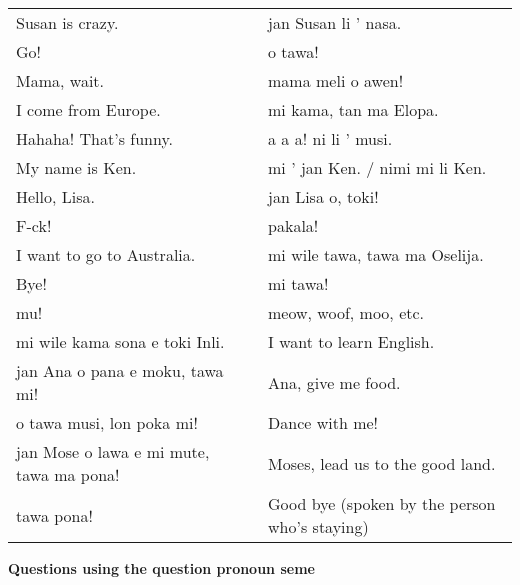 \begin{supertabular}{p{5,5cm}|ll}
Susan is crazy.  && jan Susan li ' nasa. \\ %
Go!  && o tawa! \\ %
Mama, wait.  && mama meli o awen! \\ %
I come from Europe. && mi kama, tan ma Elopa. \\ %
Hahaha! That's funny.  && a a a! ni li ' musi. \\ %
My name is Ken.  && mi ' jan Ken. / nimi mi li Ken. \\ %
Hello, Lisa.  && jan Lisa o, toki! \\ %
F-ck! && pakala! \\ %
I want to go to Australia. && mi wile tawa, tawa ma Oselija. \\  %
Bye!  && mi tawa!  \\ %
mu!  && meow, woof, moo, etc. \\
mi wile kama sona e toki Inli.  && I want to learn English. \\
jan Ana o pana e moku, tawa mi!  && Ana, give me food. \\
o tawa musi, lon poka mi!  && Dance with me! \\
jan Mose o lawa e mi mute, tawa ma pona!  && Moses, lead us to the good land. \\
tawa pona!  && Good bye (spoken by the person who's staying) \\
\end{supertabular} 

\textbf{Questions using the question pronoun seme} 
\label{'questions_using_seme'}


